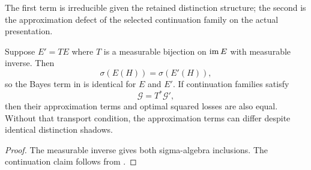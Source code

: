 The first term is irreducible given the retained distinction structure; the second is the approximation defect of the selected continuation family on the actual presentation.

\begin{corollary}\label{cor:presentation-bayes-v13}
Suppose $E'=TE$ where $T$ is a measurable bijection on $\operatorname{im} E$ with measurable inverse. Then
\[
\sigma(E(H))=\sigma(E'(H)),
\]
so the Bayes term in  is identical for $E$ and $E'$. If continuation families satisfy
\[
\mathcal G=T^*\mathcal G',
\]
then their approximation terms and optimal squared losses are also equal. Without that transport condition, the approximation terms can differ despite identical distinction shadows.
\end{corollary}

\begin{proof}
The measurable inverse gives both sigma-algebra inclusions. The continuation claim follows from .
\end{proof}
